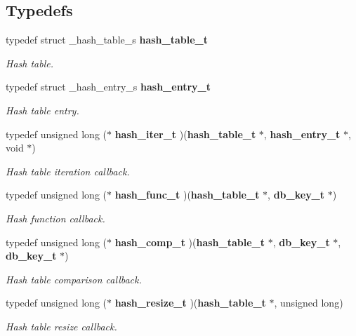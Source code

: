 \subsection*{Typedefs}
\begin{CompactItemize}
\item 
typedef struct \_\-hash\_\-table\_\-s {\bf hash\_\-table\_\-t}
\begin{CompactList}\small\item\em Hash table.\item\end{CompactList}\item 
typedef struct \_\-hash\_\-entry\_\-s {\bf hash\_\-entry\_\-t}
\begin{CompactList}\small\item\em Hash table entry.\item\end{CompactList}\item 
typedef unsigned long ($\ast$ {\bf hash\_\-iter\_\-t} )({\bf hash\_\-table\_\-t} $\ast$, {\bf hash\_\-entry\_\-t} $\ast$, void $\ast$)
\begin{CompactList}\small\item\em Hash table iteration callback.\item\end{CompactList}\item 
typedef unsigned long ($\ast$ {\bf hash\_\-func\_\-t} )({\bf hash\_\-table\_\-t} $\ast$, {\bf db\_\-key\_\-t} $\ast$)
\begin{CompactList}\small\item\em Hash function callback.\item\end{CompactList}\item 
typedef unsigned long ($\ast$ {\bf hash\_\-comp\_\-t} )({\bf hash\_\-table\_\-t} $\ast$, {\bf db\_\-key\_\-t} $\ast$, {\bf db\_\-key\_\-t} $\ast$)
\begin{CompactList}\small\item\em Hash table comparison callback.\item\end{CompactList}\item 
typedef unsigned long ($\ast$ {\bf hash\_\-resize\_\-t} )({\bf hash\_\-table\_\-t} $\ast$, unsigned long)
\begin{CompactList}\small\item\em Hash table resize callback.\item\end{CompactList}\end{CompactItemize}
